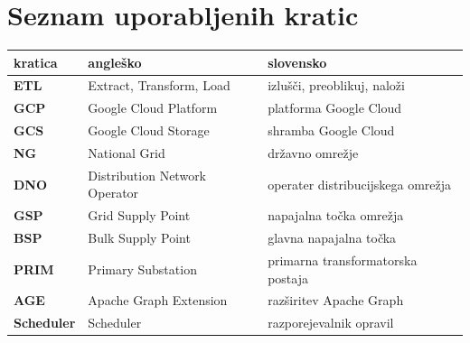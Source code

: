 \documentclass[a4paper,12pt,openright]{book}
\newcommand{\clearemptydoublepage}{\newpage{\pagestyle{empty}\cleardoublepage}}
\begin{document}
\clearemptydoublepage



\clearemptydoublepage


\pagestyle{empty}
\def\thepage{}%
\tableofcontents{}


\clearemptydoublepage



\chapter*{Seznam uporabljenih kratic}

\noindent\begin{tabular}{p{}|p{}|p{}}    %
  {\bf kratica} & {\bf angleško}                              & {\bf slovensko} \\ \hline
  {\bf ETL}   & Extract, Transform, Load              & izlušči, preoblikuj, naloži \\
  {\bf GCP}   & Google Cloud Platform              & platforma Google Cloud \\
  {\bf GCS}   & Google Cloud Storage              & shramba Google Cloud \\
  {\bf NG}   & National Grid              & državno omrežje \\
  {\bf DNO}   & Distribution Network Operator              & operater distribucijskega omrežja \\
  {\bf GSP}   & Grid Supply Point              & napajalna točka omrežja \\
  {\bf BSP}   & Bulk Supply Point              & glavna napajalna točka \\
  {\bf PRIM}   & Primary Substation              & primarna transformatorska postaja \\
  {\bf AGE}   & Apache Graph Extension              & razširitev Apache Graph \\
  {\bf Scheduler}    & Scheduler & razporejevalnik opravil \\
\end{tabular}



\clearemptydoublepage
\end{document}
